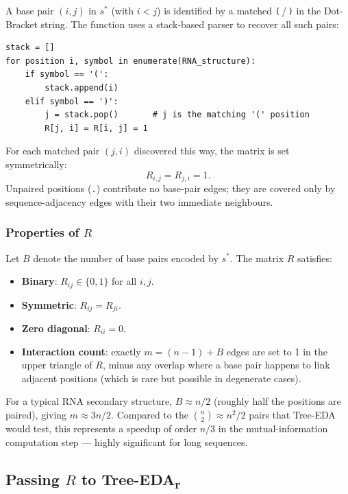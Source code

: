 \documentclass[11pt,a4paper]{article}
\begin{document}
A base pair $(i, j)$ in $s^*$ (with $i < j$) is identified by a matched
\texttt{(}\,/\,\texttt{)} in the Dot-Bracket string. The function uses
a stack-based parser to recover all such pairs:
\begin{center}
\begin{minipage}{0.85\textwidth}
\begin{verbatim}
stack = []
for position i, symbol in enumerate(RNA_structure):
    if symbol == '(':
        stack.append(i)
    elif symbol == ')':
        j = stack.pop()       # j is the matching '(' position
        R[j, i] = R[i, j] = 1
\end{verbatim}
\end{minipage}
\end{center}
For each matched pair $(j, i)$ discovered this way, the matrix is set
symmetrically:
\[
  R_{i,j} = R_{j,i} = 1.
\]
Unpaired positions (\texttt{.}) contribute no base-pair edges; they are
covered only by sequence-adjacency edges with their two immediate neighbours.

\subsubsection*{Properties of $R$}

Let $B$ denote the number of base pairs encoded by $s^*$. The matrix $R$
satisfies:
\begin{itemize}
  \item \textbf{Binary}: $R_{ij} \in \{0,1\}$ for all $i, j$.
  \item \textbf{Symmetric}: $R_{ij} = R_{ji}$.
  \item \textbf{Zero diagonal}: $R_{ii} = 0$.
  \item \textbf{Interaction count}: exactly $m = (n-1) + B$ edges are set
    to 1 in the upper triangle of $R$, minus any overlap where a base pair
    happens to link adjacent positions (which is rare but possible in
    degenerate cases).
\end{itemize}

For a typical RNA secondary structure, $B \approx n/2$ (roughly half the
positions are paired), giving $m \approx 3n/2$. Compared to the $\binom{n}{2}
\approx n^2/2$ pairs that Tree-EDA would test, this represents a speedup of
order $n/3$ in the mutual-information computation step — highly significant
for long sequences.

\subsection{Passing $R$ to Tree-EDA\textsubscript{r}}
\end{document}
